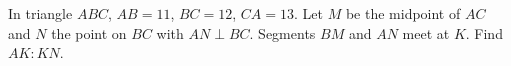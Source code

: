 In triangle $ABC$, $AB=11$, $BC=12$, $CA=13$. Let $M$ be the midpoint of $AC$ and $N$ the point on $BC$ with $AN\perp BC$. Segments $BM$ and $AN$ meet at $K$. Find $AK:KN$.
